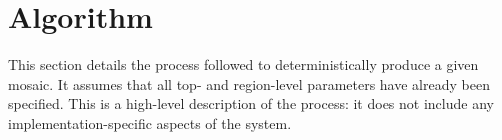 \newcommand{\ntl}{\(N_{tl}\)}
\newcommand{\ak}{\(AK\)}
\newcommand{\akc}{\ak\(_{c}\)}
\newcommand{\TextLineIMaskSymbol}{\(TLM_{i,r}\)}
\newcommand{\TextLineISymbol}{\(TL_{i,r}\)}
\newcommand{\GDataCtrSymbol}{\(GDC\)}
\newcommand{\GDataRotSymbol}{\(GDR\)}
\newcommand{\GDataDnsSymbol}{\(GDD\)}
\newcommand{\GDataGlySymbol}{\(GDG\)}
\newcommand{\OutBmSymbol}{\(OB\)}


\section{Algorithm}
\label{apx:algorithm}
This section details the process followed to deterministically produce a given mosaic.
It assumes that all top- and region-level parameters have already been specified.
This is a high-level description of the process: it does not include any implementation-specific aspects of the system.

